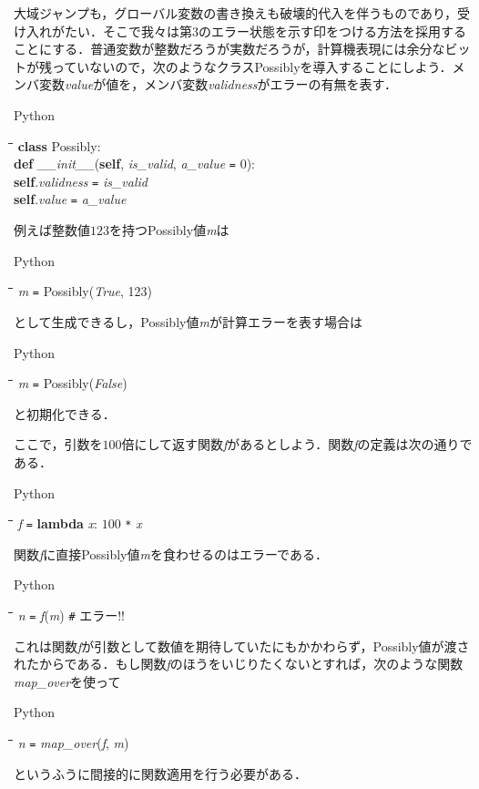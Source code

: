 \documentclass[twocolumn]{jsbook}
\newenvironment{pythoncode}{\begin{itembox}[r]{Python}}{\end{itembox}}
\newenvironment{python}{\begin{tabbing}\hspace*{1em}\=\hspace*{1em}\=\hspace*{1em}\=\hspace*{1em}\=\kill}{\end{tabbing}}
\newcommand{\pthnId}[1]{\textit{#1}}
\newcommand{\pthnKeyword}[1]{\textbf{#1}}
\newcommand{\pthnOp}[1]{\texttt{#1}}
\begin{document}
大域ジャンプも，グローバル変数の書き換えも破壊的代入を伴うものであり，受け入れがたい．そこで我々は第3のエラー状態を示す印をつける方法を採用することにする．普通変数が整数だろうが実数だろうが，計算機表現には余分なビットが残っていないので，次のようなクラスPossiblyを導入することにしよう．メンバ変数\pthnId{value}が値を，メンバ変数\pthnId{validness}がエラーの有無を表す．
\begin{pythoncode}
\begin{python}
\pthnKeyword{class} {Possibly}:\\
\>\pthnKeyword{def} \pthnId{\_\_init\_\_}(\pthnKeyword{self}, \pthnId{is\_valid}, \pthnId{a\_value} \pthnOp{=} $0$):\\
\>\>\pthnKeyword{self}.\pthnId{validness} \pthnOp{=} \pthnId{is\_valid}\\
\>\>\pthnKeyword{self}.\pthnId{value} \pthnOp{=} \pthnId{a\_value}
\end{python}
\end{pythoncode}

例えば整数値$123$を持つPossibly値\pthnId{m}は
\begin{pythoncode}
\begin{python}
\pthnId{m} \pthnOp{=} Possibly(\pthnId{True}, 123)
\end{python}
\end{pythoncode}
として生成できるし，Possibly値\pthnId{m}が計算エラーを表す場合は
\begin{pythoncode}
\begin{python}
\pthnId{m} \pthnOp{=} Possibly(\pthnId{False})
\end{python}
\end{pythoncode}
と初期化できる．

ここで，引数を$100$倍にして返す関数\pthnId{f}があるとしよう．関数\pthnId{f}の定義は次の通りである．
\begin{pythoncode}
\begin{python}
\pthnId{f} \pthnOp{=} \pthnKeyword{lambda} \pthnId{x}: $100$ \pthnOp{*} \pthnId{x}
\end{python}
\end{pythoncode}

関数\pthnId{f}に直接Possibly値\pthnId{m}を食わせるのはエラーである．
\begin{pythoncode}
\begin{python}
\pthnId{n} \pthnOp{=} \pthnId{f}(\pthnId{m}) \texttt{\#} エラー!! 
\end{python}
\end{pythoncode}
これは関数\pthnId{f}が引数として数値を期待していたにもかかわらず，Possibly値が渡されたからである．もし関数\pthnId{f}のほうをいじりたくないとすれば，次のような関数\pthnId{map\_over}を使って
\begin{pythoncode}
\begin{python}
\pthnId{n} \pthnOp{=} \pthnId{map\_over}(\pthnId{f}, \pthnId{m}) 
\end{python}
\end{pythoncode}
というふうに間接的に関数適用を行う必要がある．
\end{document}
